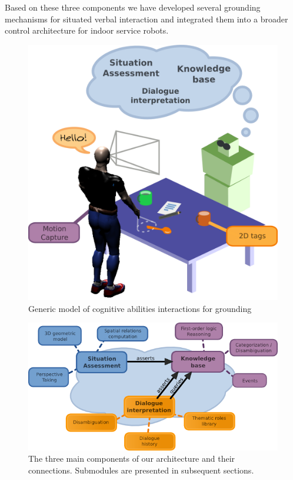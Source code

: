\documentclass[twocolumn]{svjour3}
\begin{document}
Based on these three components we have developed several grounding mechanisms
for situated verbal interaction and integrated them into a broader control
architecture for indoor service robots. 

\begin{figure}[!ht]
\centering
  \includegraphics[width=0.8\linewidth]{images/grounding_robot.png}
  \caption{Generic model of cognitive abilities interactions for grounding}
  \label{fig|overall-process}
\end{figure}

\begin{figure}[!ht]
\centering
  \includegraphics[width=0.9\linewidth]{images/grounding.png}
  \caption{The three main components of our architecture and their connections. Submodules are presented in subsequent sections.}
  \label{fig|main-components}
\end{figure}
\end{document}

